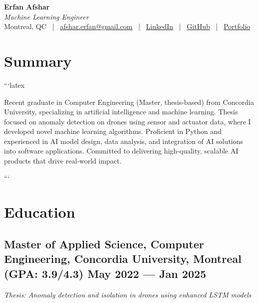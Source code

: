 \documentclass[a4,10pt]{article}
\begin{document}

\begin{center}
    {\Huge \textbf{Erfan Afshar}} \\[0.15cm]
    {\color{UI_blue} \large \textit{Machine Learning Engineer}} \\[0.1cm]
    
    \large
    Montreal, QC \, | \,
    \href{mailto:afshar.erfan@gmail.com}{afshar.erfan@gmail.com} \, | \,
    \href{https://www.linkedin.com/in/erfan-afshar}{LinkedIn} \, | \,
    \href{https://github.com/Erfanafshar}{GitHub} \, | \,
    \href{https://erfanafshar.github.io}{Portfolio} 
\end{center}



\section{Summary}
```latex
\noindent
\begin{minipage}{\textwidth}
Recent graduate in Computer Engineering (Master, thesis-based) from Concordia University, specializing in artificial intelligence and machine learning. Thesis focused on anomaly detection on drones using sensor and actuator data, where I developed novel machine learning algorithms. Proficient in Python and experienced in AI model design, data analysis, and integration of AI solutions into software applications. Committed to delivering high-quality, scalable AI products that drive real-world impact.
\end{minipage}
```
\section{Education}
\subsection*{Master of Applied Science, Computer Engineering, {\normalsize \normalfont Concordia University, Montreal (GPA: 3.9/4.3)} \hfill May 2022 --- Jan 2025} 
\textit{Thesis: Anomaly detection and isolation in drones using enhanced LSTM models}
\end{document}

